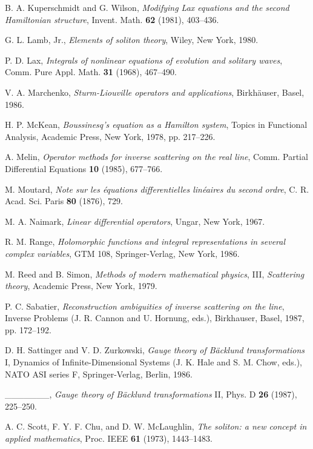 \documentclass{surv-l}
\theoremstyle{plain}
\theoremstyle{definition}
\numberwithin{equation}{chapter}
\begin{document}
\begin{thebibliography}{AKNS}
 B. A. Kuperschmidt and G. Wilson, \emph{Modifying Lax equations and the second Hamiltonian structure}, Invent. Math. \textbf{62} (1981), 403--436.

 G. L. Lamb, Jr., \emph{Elements of soliton theory}, Wiley, New York, 1980.

 P. D. Lax, \emph{Integrals of nonlinear equations of evolution and solitary waves}, Comm. Pure Appl. Math. \textbf{31} (1968), 467--490.

 V. A. Marchenko, \emph{Sturm-Liouville operators and applications}, Birkh\"{a}user, Basel, 1986.

 H. P. McKean, \emph{Boussinesq's equation as a Hamilton system}, Topics in Functional Analysis, Academic Press, New York, 1978, pp. 217--226.

 A. Melin, \emph{Operator methods for inverse scattering on the real line}, Comm. Partial Differential Equations \textbf{10} (1985), 677--766.

 M. Moutard, \emph{Note sur les \'{e}quations differentielles lin\'{e}aires du second ordre}, C. R. Acad. Sci. Paris \textbf{80} (1876), 729.

 M. A. Naimark, \emph{Linear differential operators}, Ungar, New York, 1967.

 R. M. Range, \emph{Holomorphic functions and integral representations in several complex variables}, GTM 108, Springer-Verlag, New York, 1986.

 M. Reed and B. Simon, \emph{Methods of modern mathematical physics}, III, \emph{Scattering theory}, Academic Press, New York, 1979.

 P. C. Sabatier, \emph{Reconstruction ambiguities of inverse scattering on the line}, Inverse Problems (J. R. Cannon and U. Hornung, eds.), Birkhauser, Basel, 1987, pp. 172--192.

 D. H. Sattinger and V. D. Zurkowski, \emph{Gauge theory of B\"{a}cklund transformations} I, Dynamics of Infinite-Dimensional Systems (J. K. Hale and S. M. Chow, eds.), NATO ASI series F, Springer-Verlag, Berlin, 1986.

 \_\_\_\_\_\_\_, \emph{Gauge theory of B\"{a}cklund transformations} II, Phys. D \textbf{26} (1987), 225--250.

 A. C. Scott, F. Y. F. Chu, and D. W. McLaughlin, \emph{The soliton: a new concept in applied mathematics}, Proc. IEEE \textbf{61} (1973), 1443--1483.


\end{thebibliography}
\end{document}

